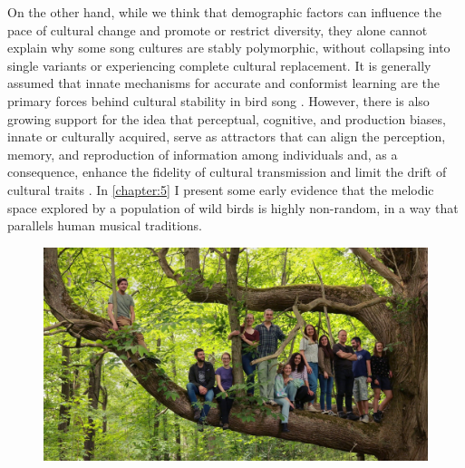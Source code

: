 On the other hand, while we think that demographic factors can influence the pace of cultural change and promote or restrict diversity, they alone cannot explain why some song cultures are stably polymorphic, without collapsing into single variants or experiencing complete cultural replacement. It is generally assumed that innate mechanisms for accurate and conformist learning are the primary forces behind cultural stability in bird song \parencite{lachlan2018, lachlan2003a}. However, there is also growing support for the idea that perceptual, cognitive, and production biases, innate or culturally acquired, serve as attractors that can align the perception, memory, and reproduction of information among individuals and, as a consequence, enhance the fidelity of cultural transmission and limit the drift of cultural traits \parencite{feher2009, saldana2019, trehub2015}. In \autoref{chapter:5} I present some early evidence that the melodic space explored by a population of wild birds is highly non-random, in a way that parallels human musical traditions.

\begin{figure}[th!]
    \centering
    \includegraphics[width=\linewidth]{figures/chapter_1/wytham-group.jpg}
    \label{c1_fig:nilo}
\end{figure}

